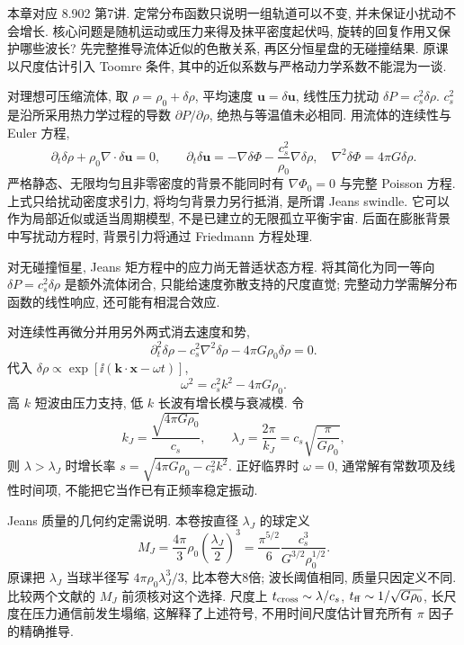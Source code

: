
本章对应 8.902 第7讲. 定常分布函数只说明一组轨道可以不变, 并未保证小扰动不会增长. 核心问题是随机运动或压力来得及抹平密度起伏吗, 旋转的回复作用又保护哪些波长? 先完整推导流体近似的色散关系, 再区分恒星盘的无碰撞结果. 原课以尺度估计引入 Toomre 条件, 其中的近似系数与严格动力学系数不能混为一谈.

对理想可压缩流体, 取 $\rho=\rho_0+\delta\rho$, 平均速度 $\boldsymbol u=\delta\boldsymbol u$, 线性压力扰动 $\delta P=c_s^2\delta\rho$. $c_s^2$ 是沿所采用热力学过程的导数 $\partial P/\partial\rho$, 绝热与等温值未必相同. 用流体的连续性与 Euler 方程,
\[
\partial_t\delta\rho+\rho_0\nabla\cdot\delta\boldsymbol u=0,
\qquad
\partial_t\delta\boldsymbol u=-\nabla\delta\Phi-
\frac{c_s^2}{\rho_0}\nabla\delta\rho,
\quad \nabla^2\delta\Phi=4\pi G\delta\rho.
\]
严格静态、无限均匀且非零密度的背景不能同时有 $\nabla\Phi_0=0$ 与完整 Poisson 方程. 上式只给扰动密度求引力, 将均匀背景力另行抵消, 是所谓 Jeans swindle. 它可以作为局部近似或适当周期模型, 不是已建立的无限孤立平衡宇宙. 后面在膨胀背景中写扰动方程时, 背景引力将通过 Friedmann 方程处理.

对无碰撞恒星, Jeans 矩方程中的应力尚无普适状态方程. 将其简化为同一等向 $\delta P=c_s^2\delta\rho$ 是额外流体闭合, 只能给速度弥散支持的尺度直觉; 完整动力学需解分布函数的线性响应, 还可能有相混合效应.

对连续性再微分并用另外两式消去速度和势,
\[
\partial_t^2\delta\rho-c_s^2\nabla^2\delta\rho
-4\pi G\rho_0\delta\rho=0.
\]
代入 $\delta\rho\propto\exp[\ii(\boldsymbol k\cdot\boldsymbol x-\omega t)]$,
\[
\omega^2=c_s^2k^2-4\pi G\rho_0.
\]
高 $k$ 短波由压力支持, 低 $k$ 长波有增长模与衰减模. 令
\[
k_J=\frac{\sqrt{4\pi G\rho_0}}{c_s},\qquad
\lambda_J=\frac{2\pi}{k_J}=c_s\sqrt{\frac{\pi}{G\rho_0}},
\]
则 $\lambda>\lambda_J$ 时增长率 $s=\sqrt{4\pi G\rho_0-c_s^2k^2}$. 正好临界时 $\omega=0$, 通常解有常数项及线性时间项, 不能把它当作已有正频率稳定振动.

Jeans 质量的几何约定需说明. 本卷按直径 $\lambda_J$ 的球定义
\[
M_J=\frac{4\pi}{3}\rho_0\left(\frac{\lambda_J}{2}\right)^3
=\frac{\pi^{5/2}}6\frac{c_s^3}{G^{3/2}\rho_0^{1/2}}.
\]
原课把 $\lambda_J$ 当球半径写 $4\pi\rho_0\lambda_J^3/3$, 比本卷大8倍; 波长阈值相同, 质量只因定义不同. 比较两个文献的 $M_J$ 前须核对这个选择. 尺度上 $t_{\rm cross}\sim\lambda/c_s$, $t_{\rm ff}\sim1/\sqrt{G\rho_0}$, 长尺度在压力通信前发生塌缩, 这解释了上述符号, 不用时间尺度估计冒充所有 $\pi$ 因子的精确推导.

